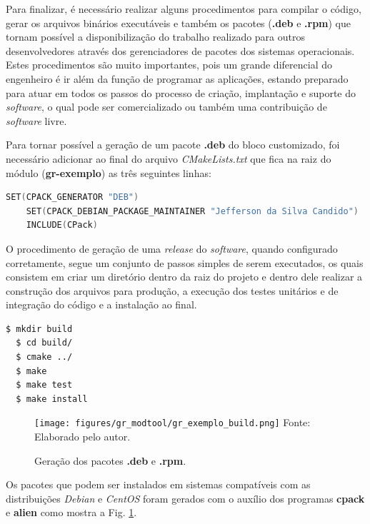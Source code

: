 \documentclass[
  12pt,				%
  openright,			%
  twoside,			%
  a4paper,			%
  english,			%
  french,				%
  spanish,			%
  brazil,				%
  ]{abntex2}
\begin{document}
Para finalizar, é necessário realizar alguns procedimentos para compilar o código, gerar os arquivos binários executáveis e também os pacotes (\textbf{.deb} e \textbf{.rpm}) que tornam
possível a disponibilização do trabalho realizado para outros desenvolvedores através dos gerenciadores de pacotes dos sistemas operacionais. Estes procedimentos são muito importantes,
pois um grande diferencial do engenheiro é ir além da função de programar as aplicações, estando preparado para atuar em todos os passos do processo de criação,
implantação e suporte do \textit{software}, o qual pode ser comercializado ou também uma contribuição de \textit{software} livre.

Para tornar possível a geração de um pacote \textbf{.deb} do bloco customizado, foi necessário adicionar ao final do arquivo \textit{CMakeLists.txt}
que fica na raiz do módulo (\textbf{gr-exemplo}) as três seguintes linhas:

\begin{adjustbox}{max width=\linewidth}
  \begin{lstlisting}[language=C++]
    SET(CPACK_GENERATOR "DEB")
    SET(CPACK_DEBIAN_PACKAGE_MAINTAINER "Jefferson da Silva Candido")
    INCLUDE(CPack)
  \end{lstlisting}
\end{adjustbox}

O procedimento de geração de uma \textit{release} do \textit{software}, quando configurado corretamente, segue um conjunto de passos simples de serem executados, os quais consistem em criar um diretório
dentro da raiz do projeto e dentro dele realizar a construção dos arquivos para produção, a execução dos testes unitários e de integração do código e a instalação ao final.

\begin{adjustbox}{max width=\linewidth}
  \begin{lstlisting}[language=bash]
  $ mkdir build
  $ cd build/
  $ cmake ../
  $ make
  $ make test
  $ make install
  \end{lstlisting}
\end{adjustbox}

\begin{figure}[!htb]
  \centering
  \caption{Geração dos pacotes \textbf{.deb} e \textbf{.rpm}.}
  \texttt{[image: figures/gr\_modtool/gr\_exemplo\_build.png]}
  Fonte: Elaborado pelo autor.
  \label{fig:gr_exemplo_build}
\end{figure}

Os pacotes que podem ser instalados em sistemas compatíveis com as distribuições \textit{Debian} e \textit{CentOS} foram gerados com o auxílio dos programas \textbf{cpack} e \textbf{alien} como mostra a
Fig. \ref{fig:gr_exemplo_build}.
\end{document}
